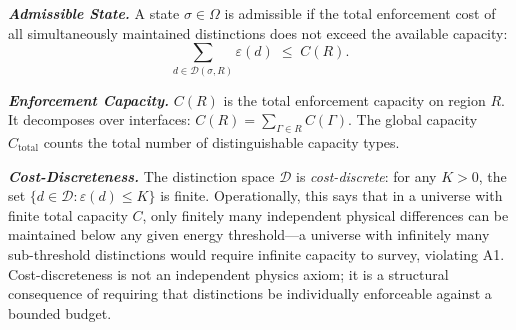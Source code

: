 \documentclass[11pt]{article}
\begin{document}
\begin{tcolorbox}[apfbox, title={Definitions (Distinction, Enforcement Cost, Interface, Admissible State, Capacity)}]
\medskip
\textbf{\textit{Admissible State.}} A state $\sigma \in \Omega$ is admissible if the total enforcement cost of all simultaneously maintained distinctions does not exceed the available capacity:
\[
\sum_{d \in \mathcal{D}(\sigma, R)} \varepsilon(d) \;\le\; C(R).
\]

\medskip
\textbf{\textit{Enforcement Capacity.}} $C(R)$ is the total enforcement capacity on region $R$.  It decomposes over interfaces: $C(R) = \sum_{\Gamma \in R} C(\Gamma)$.  The global capacity $C_{\mathrm{total}}$ counts the total number of distinguishable capacity types.

\medskip
\textbf{\textit{Cost-Discreteness.}}  The distinction space $\mathcal{D}$ is \emph{cost-discrete}: for any $K > 0$, the set $\{d \in \mathcal{D} : \varepsilon(d) \le K\}$ is finite.  Operationally, this says that in a universe with finite total capacity $C$, only finitely many independent physical differences can be maintained below any given energy threshold---a universe with infinitely many sub-threshold distinctions would require infinite capacity to survey, violating A1.  Cost-discreteness is not an independent physics axiom; it is a structural consequence of requiring that distinctions be individually enforceable against a bounded budget.


\end{tcolorbox}
\end{document}
